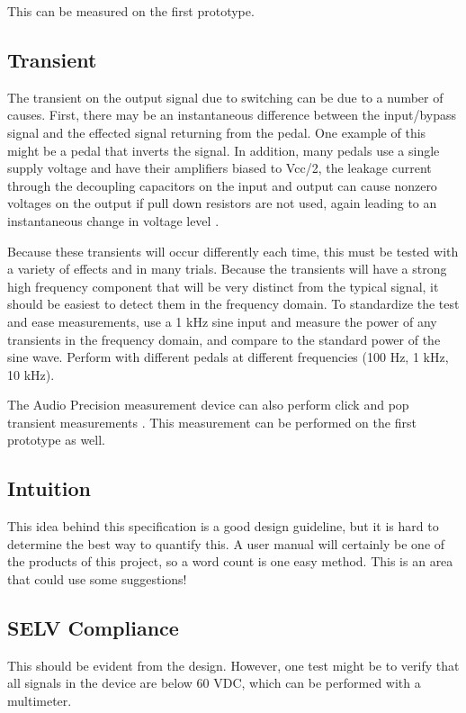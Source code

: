 \documentclass{article}
\begin{document}
	This can be measured on the first prototype.

	\subsection{Transient}
	The transient on the output signal due to switching can be due to a number of causes.  First, there may be an instantaneous difference between the input/bypass signal and the effected signal returning from the pedal.  One example of this might be a pedal that inverts the signal.  In addition, many pedals use a single supply voltage and have their amplifiers biased to Vcc/2, the leakage current through the decoupling capacitors on the input and output can cause nonzero voltages on the output if pull down resistors are not used, again leading to an instantaneous change in voltage level \cite{JackOrman}.

	Because these transients will occur differently each time, this must be tested with a variety of effects and in many trials.  Because the transients will have a strong high frequency component that will be very distinct from the typical signal, it should be easiest to detect them in the frequency domain.  To standardize the test and ease measurements, use a 1 kHz sine input and measure the power of any transients in the frequency domain, and compare to the standard power of the sine wave.  Perform with different pedals at different frequencies (100 Hz, 1 kHz, 10 kHz).

	The Audio Precision measurement device can also perform click and pop transient measurements \cite{APclickpopmeasurement}.  This measurement can be performed on the first prototype as well.

	\subsection{Intuition}
	This idea behind this specification is a good design guideline, but it is hard to determine the best way to quantify this.  A user manual will certainly be one of the products of this project, so a word count is one easy method.  This is an area that could use some suggestions!

	\subsection{SELV Compliance}
	This should be evident from the design.  However, one test might be to verify that all signals in the device are below 60 VDC, which can be performed with a multimeter.
\end{document}
